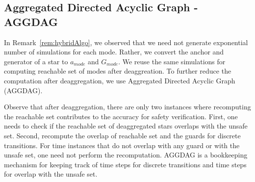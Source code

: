 \subsection{Aggregated Directed Acyclic Graph - AGGDAG}
\label{sec:aggdag}

In Remark~\ref{rem:hybridAlgo}, we observed that we need not generate exponential number of simulations for each mode. Rather, we convert the anchor and generator of a star to $a_{mode}$ and $G_{mode}$. We reuse the same simulations for computing reachable set of modes after deaggreation. To further reduce the computation after deaggregation, we use Aggregated Directed Acyclic Graph (AGGDAG).

Observe that after deaggregation, there are only two instances where recomputing the reachable set contributes to the accuracy for safety verification. First, one needs to check if the reachable set of deaggregated stars overlaps with the unsafe set. Second, recompute the overlap of reachable set and the guards for discrete transitions. For time instances that do not overlap with any guard or with the unsafe set, one need not perform the recomputation. AGGDAG is a bookkeeping mechanism for keeping track of time steps for discrete transitions and time steps for overlap with the unsafe set.
 
%

